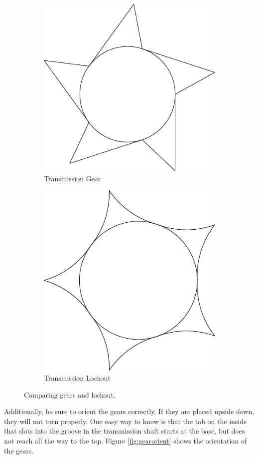 \documentclass[openany]{book}
\begin{document}
\begin{figure}[!ht]
	\centering
	\begin{subfigure}{.4\textwidth}
		\centering
		\includegraphics[width=.45\textwidth]{images/transmission-gear.pdf}
		\caption{Transmission Gear}
	\end{subfigure}
	\begin{subfigure}{.4\textwidth}
		\centering
		\includegraphics[width=.45\textwidth]{images/transmission-lockout.pdf}
		\caption{Transmission Lockout}
	\end{subfigure}
	\caption{Comparing gears and lockout.}
	\label{fig:transmission:dif}
\end{figure}



Additionally, be sure to orient the gears correctly. If they are placed upside down, they will not turn properly. One easy way to know is that the tab on the inside that slots into the groove in the transmission shaft starts at the base, but does not reach all the way to the top. Figure \ref{fig:gearorient} shows the orientation of the gears.
\end{document}
